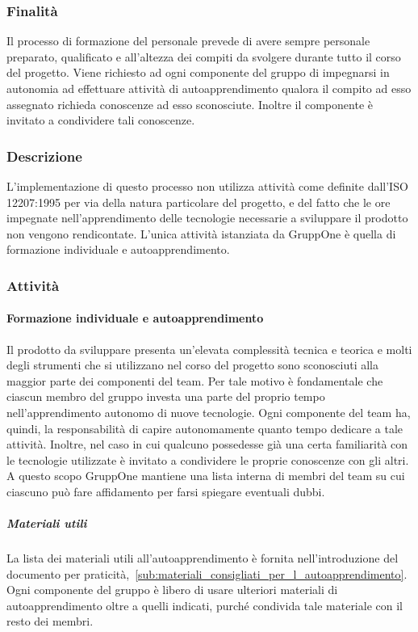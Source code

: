 \documentclass[../../norme-di-progetto.tex]{subfiles}
\begin{document}
\subsubsection{Finalità}%
\label{subs:formazione_del_personale/finalita}

Il processo di formazione del personale prevede di avere sempre personale preparato, qualificato e all'altezza dei compiti da svolgere durante tutto il corso del progetto.
Viene richiesto ad ogni componente del gruppo di impegnarsi in autonomia ad effettuare attività di autoapprendimento qualora il compito
ad esso assegnato richieda conoscenze ad esso sconosciute. Inoltre il componente è invitato a condividere tali conoscenze.

\subsubsection{Descrizione}%
\label{subs:formazione_del_personale/descrizione}

L'implementazione di questo processo non utilizza attività come definite dall'ISO 12207:1995 per via della natura particolare del progetto, e del fatto che le ore impegnate nell'apprendimento delle tecnologie necessarie a sviluppare il prodotto non vengono rendicontate.
L'unica attività istanziata da GruppOne è quella di formazione individuale e autoapprendimento.

\subsubsection{Attività}%
\label{subs:formazione_del_personale/attivita}

\paragraph{Formazione individuale e autoapprendimento}%
\label{par:formazione_individuale_e_autoapprendimento}

Il prodotto da sviluppare presenta un'elevata complessità tecnica e teorica e molti degli strumenti che si utilizzano nel corso del progetto sono sconosciuti alla maggior parte dei componenti del team.
Per tale motivo è fondamentale che ciascun membro del gruppo investa una parte del proprio tempo nell'apprendimento autonomo di nuove tecnologie.
Ogni componente del team ha, quindi, la responsabilità di capire autonomamente quanto tempo dedicare a tale attività.
Inoltre, nel caso in cui qualcuno possedesse già una certa familiarità con le tecnologie utilizzate è invitato a condividere le proprie conoscenze con gli altri. A questo scopo GruppOne mantiene una lista interna di membri del team su cui ciascuno può fare affidamento per farsi spiegare eventuali dubbi.

\subparagraph{Materiali utili}%
\label{subp:materiali_utili}

La lista dei materiali utili all'autoapprendimento è fornita nell'introduzione del documento per praticità,~\ref{sub:materiali_consigliati_per_l_autoapprendimento}.
Ogni componente del gruppo è libero di usare ulteriori materiali di autoapprendimento oltre a quelli indicati, purché condivida tale materiale con il resto dei membri.
\end{document}
